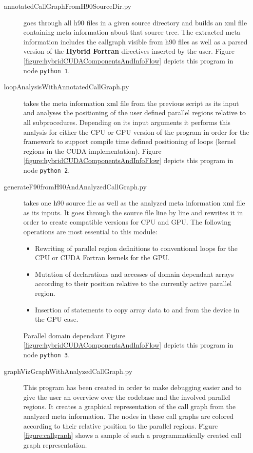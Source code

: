 \begin{description}
 \item[annotatedCallGraphFromH90SourceDir.py] goes through all h90 files in a given source directory and builds an xml file containing meta information about that source tree. The extracted meta information includes the callgraph visible from h90 files as well as a parsed version of the \textbf{Hybrid Fortran} directives inserted by the user. Figure \ref{figure:hybridCUDAComponentsAndInfoFlow} depicts this program in node \verb|python 1|.
 \item[loopAnalysisWithAnnotatedCallGraph.py] takes the meta information xml file from the previous script as its input and analyses the positioning of the user defined parallel regions relative to all subprocedures. Depending on its input arguments it performs this analysis for either the CPU or GPU version of the program in order for the framework to support compile time defined positioning of loops (kernel regions in the CUDA implementation). Figure \ref{figure:hybridCUDAComponentsAndInfoFlow} depicts this program in node \verb|python 2|.
 \item[generateF90fromH90AndAnalyzedCallGraph.py] takes one h90 source file as well as the analyzed meta information xml file as its inputs. It goes through the source file line by line and rewrites it in order to create compatible versions for CPU and GPU. The following operations are most essential to this module: 
 \begin{itemize}
  \item Rewriting of parallel region definitions to conventional loops for the CPU or CUDA Fortran kernels for the GPU.
  \item Mutation of declarations and accesses of domain dependant arrays according to their position relative to the currently active parallel region.
  \item Insertion of statements to copy array data to and from the device in the GPU case.
 \end{itemize}
 Parallel domain dependant Figure \ref{figure:hybridCUDAComponentsAndInfoFlow} depicts this program in node \verb|python 3|.
 \item[graphVizGraphWithAnalyzedCallGraph.py] This program has been created in order to make debugging easier and to give the user an overview over the codebase and the involved parallel regions. It creates a graphical representation of the call graph from the analyzed meta information. The nodes in these call graphs are colored according to their relative position to the parallel regions. Figure \ref{figure:callgraph} shows a sample of such a programmatically created call graph representation.
\end{description}

